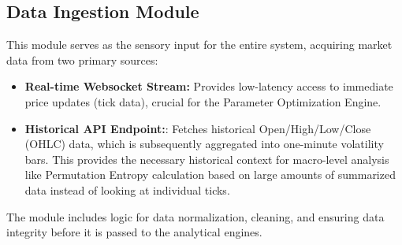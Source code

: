 \documentclass[10pt]{article}
\begin{document}
\subsection{Data Ingestion Module}
This module serves as the sensory input for the entire system, acquiring market data from two primary sources:
\begin{itemize}
    \item \textbf{Real-time Websocket Stream:} Provides low-latency access to immediate price updates (tick data), crucial for the Parameter Optimization Engine.
    \item \textbf{Historical API Endpoint:}: Fetches historical Open/High/Low/Close (OHLC) data, which is subsequently aggregated into one-minute volatility bars. This provides the necessary historical context for macro-level analysis like Permutation Entropy calculation based on large amounts of summarized data instead of looking at individual ticks.
\end{itemize}
The module includes logic for data normalization, cleaning, and ensuring data integrity before it is passed to the analytical engines.
\end{document}
